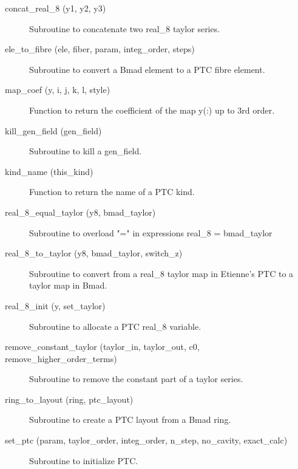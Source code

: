 \begin{description}

\item[concat\_real\_8 (y1, y2, y3)] \Newline
Subroutine to concatenate two real\_8 taylor series. 

\item[ele\_to\_fibre (ele, fiber, param, integ\_order, steps)] \Newline
Subroutine to convert a Bmad element to a PTC fibre element. 

\item[map\_coef (y, i, j, k, l, style)] \Newline
Function to return the coefficient of the map y(:) up to 3rd order. 

\item[kill\_gen\_field (gen\_field)] \Newline
Subroutine to kill a gen\_field. 

\item[kind\_name (this\_kind)] \Newline
Function to return the name of a PTC kind. 

\item[real\_8\_equal\_taylor (y8, bmad\_taylor)] \Newline
Subroutine to overload "=" in expressions real\_8 = bmad\_taylor 

\item[real\_8\_to\_taylor (y8, bmad\_taylor, switch\_z)] \Newline
Subroutine to convert from a real\_8 taylor map in Etienne's PTC to a taylor map in Bmad. 

\item[real\_8\_init (y, set\_taylor)] \Newline
Subroutine to allocate a PTC real\_8 variable. 

\item[remove\_constant\_taylor (taylor\_in, taylor\_out, c0, remove\_higher\_order\_terms)] \Newline
Subroutine to remove the constant part of a taylor series. 

\item[ring\_to\_layout (ring, ptc\_layout)] \Newline
Subroutine to create a PTC layout from a Bmad ring. 

\item[set\_ptc (param, taylor\_order, integ\_order, n\_step, no\_cavity, exact\_calc)] \Newline
Subroutine to initialize PTC. 


\end{description}
